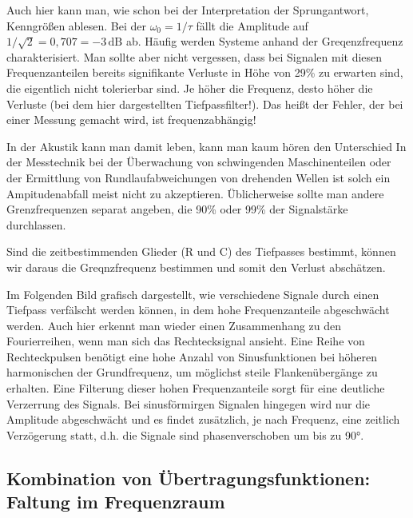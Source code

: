 \documentclass[letterpaper,10pt,english]{jupyterBook}
\begin{document}
\sphinxAtStartPar
{}

\sphinxAtStartPar
Auch hier kann man, wie schon bei der Interpretation der Sprungantwort, Kenngrößen ablesen.
Bei der  \(\omega_0 = 1/\tau\) fällt die Amplitude auf \(1/\sqrt{2} = 0,707 = -3\,\mathrm{dB}\) ab. Häufig werden Systeme anhand der Greqenzfrequenz charakterisiert. Man sollte aber nicht vergessen, dass bei Signalen mit diesen Frequenzanteilen bereits signifikante Verluste in Höhe von 29\% zu erwarten sind, die eigentlich nicht tolerierbar sind. Je höher die Frequenz, desto höher die Verluste (bei dem hier dargestellten Tiefpassfilter!). Das heißt der Fehler, der bei einer Messung gemacht wird, ist frequenzabhängig!

\sphinxAtStartPar
In der Akustik kann man damit leben, kann man kaum hören den Unterschied
In der Messtechnik bei der Überwachung von schwingenden Maschinenteilen oder der Ermittlung von Rundlaufabweichungen von drehenden Wellen ist solch ein Ampitudenabfall meist nicht zu akzeptieren.
Üblicherweise sollte man andere Grenzfrequenzen separat angeben, die 90\% oder 99\% der Signalstärke durchlassen.

\sphinxAtStartPar
Sind die zeitbestimmenden Glieder (R und C) des Tiefpasses bestimmt, können wir daraus die Greqnzfrequenz bestimmen und somit den Verlust abschätzen.

\sphinxAtStartPar
Im Folgenden Bild grafisch dargestellt, wie verschiedene Signale durch einen Tiefpass verfälscht werden können, in dem hohe Frequenzanteile abgeschwächt werden. Auch hier erkennt man wieder einen Zusammenhang zu den Fourierreihen, wenn man sich das Rechtecksignal ansieht. Eine Reihe von Rechteckpulsen benötigt eine hohe Anzahl von Sinusfunktionen bei höheren harmonischen der Grundfrequenz, um möglichst steile Flankenübergänge zu erhalten. Eine Filterung dieser hohen Frequenzanteile sorgt für eine deutliche Verzerrung des Signals. Bei sinusförmirgen Signalen hingegen wird nur die Amplitude abgeschwächt und es findet zusätzlich, je nach Frequenz, eine zeitlich Verzögerung statt, d.h. die Signale sind phasenverschoben um bis zu \sphinxhyphen{}90°.

\sphinxAtStartPar
{}


\subsection{Kombination von Übertragungsfunktionen: Faltung im Frequenzraum}
\label{\detokenize{content/5_Uebertragungsfunktion:kombination-von-ubertragungsfunktionen-faltung-im-frequenzraum}}
\sphinxAtStartPar
\end{document}
